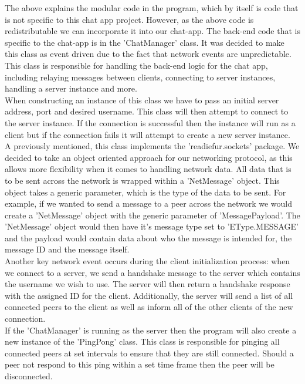 \documentclass{COMPXXXX}
\begin{document}
\normalsize \textrm {The above explains the modular code in the program, which by itself is code that is not specific to this chat app project. However, as the above code is redistributable we can incorporate it into our chat-app. The back-end code that is specific to the chat-app is in the 'ChatManager' class. It was decided to make this class as event driven due to the fact that network events are unpredictable. This class is responsible for handling the back-end logic for the chat app, including relaying messages between clients, connecting to server instances, handling a server instance and more.\\
When constructing an instance of this class we have to pass an initial server address, port and desired username. This class will then attempt to connect to the server instance. If the connection is successful then the instance will run as a client but if the connection fails it will attempt to create a new server instance.\\
A previously mentioned, this class implements the 'readiefur.sockets' package. We decided to take an object oriented approach for our networking protocol, as this allows more flexibility when it comes to handling network data.
All data that is to be sent across the network is wrapped within a 'NetMessage' object. This object takes a generic parameter, which is the type of the data to be sent. For example, if we wanted to send a message to a peer across the network we would create a 'NetMessage' object with the generic parameter of 'MessagePayload'. The 'NetMessage' object would then have it's message type set to 'EType.MESSAGE' and the payload would contain data about who the message is intended for, the message ID and the message itself.\\
Another key network event occurs during the client initialization process: when we connect to a server, we send a handshake message to the server which contains the username we wish to use. The server will then return a handshake response with the assigned ID for the client. Additionally, the server will send a list of all connected peers to the client as well as inform all of the other clients of the new connection.\\
If the 'ChatManager' is running as the server then the program will also create a new instance of the 'PingPong' class. This class is responsible for pinging all connected peers at set intervals to ensure that they are still connected. Should a peer not respond to this ping within a set time frame then the peer will be disconnected.\\
}
\end{document}
